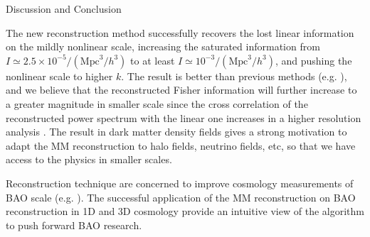 \begin{section}{Discussion and Conclusion}
 \label{sec:conclusion}


   The new reconstruction method successfully recovers the lost linear information on 
the mildly nonlinear scale, increasing the saturated information from 
$I \simeq 2.5 \times 10^{-5}/(\mathrm{Mpc}^3/h^3)$ to at least $I \simeq 10^{-3}/(\mathrm{Mpc}^3/h^3)$, 
and pushing the nonlinear scale to higher $k$. 
The result is better than previous methods 
(e.g. \cite{bib:Mark2006,bib:Mark2009,bib:Zhang2011,bib:Yu2012,bib:Mark2014}), and
we believe that the reconstructed Fisher information will further increase to a greater magnitude in smaller scale
since the cross correlation of the reconstructed power spectrum with the linear one increases                
in a higher resolution analysis \cite{bib:ZhuH2016}.
The result in dark matter density fields 
gives a strong motivation to adapt the MM reconstruction to halo fields, neutrino fields, etc, so that 
we have access to the physics in smaller scales. 

Reconstruction technique are concerned  
to improve cosmology measurements of BAO scale (e.g. \cite{bib:Daniel2007,bib:Martin2015}). 
The successful application of the MM reconstruction on BAO reconstruction in 1D 
\cite{bib:Zhu2016} and 3D \cite{bib:ZhuH2016} cosmology provide an intuitive view of the algorithm 
to push forward BAO research.


\end{section}
